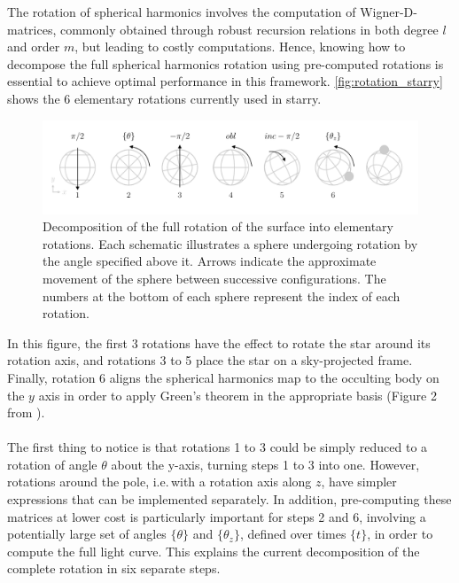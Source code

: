 \documentclass[modern]{aastex631}
\begin{document}
The rotation of spherical harmonics involves the computation of Wigner-D-matrices, commonly obtained through robust recursion relations in both degree $l$ and order $m$, but leading to costly computations. Hence, knowing how to decompose the full spherical harmonics rotation using pre-computed rotations is essential to achieve optimal performance in this framework. \autoref{fig:rotation_starry} shows the 6 elementary rotations currently used in \textsf{starry}.
\begin{figure}[H]
    \begin{center}
        \includegraphics[width=\textwidth]{../workflows/figures/rotation_starry.pdf}
        \caption{Decomposition of the full rotation of the surface into elementary rotations. Each schematic illustrates a sphere undergoing rotation by the angle specified above it. Arrows indicate the approximate movement of the sphere between successive configurations. The numbers at the bottom of each sphere represent the index of each rotation. }
        \label{fig:rotation_starry}
    \end{center}
\end{figure}
In this figure, the first 3 rotations have the effect to rotate the star around its rotation axis, and rotations 3 to 5 place the star on a sky-projected frame. Finally, rotation 6 aligns the spherical harmonics map to the occulting body on the $y$ axis in order to apply Green's theorem in the appropriate basis (Figure 2 from \citealt{starry}).\\\\
The first thing to notice is that rotations 1 to 3 could be simply reduced to a rotation of angle $\theta$ about the y-axis, turning steps 1 to 3 into one. However, rotations around the pole, i.e.\,with a rotation axis along $z$, have simpler expressions that can be implemented separately. In addition, pre-computing these matrices at lower cost is particularly important for steps 2 and 6, involving a potentially large set of angles $\{\theta\}$ and $\{\theta_z\}$, defined over times $\{t\}$, in order to compute the full light curve. This explains the current decomposition of the complete rotation in six separate steps.\\\\
\end{document}
